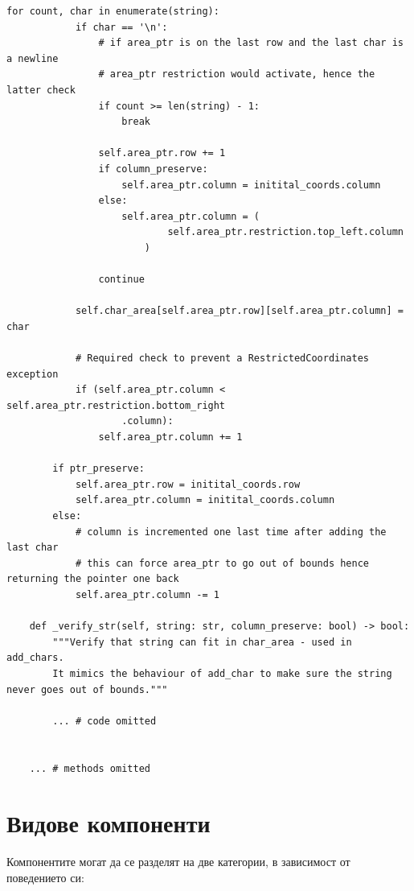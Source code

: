 \begin{lstlisting}[style=py]
        for count, char in enumerate(string):
            if char == '\n':
                # if area_ptr is on the last row and the last char is a newline
                # area_ptr restriction would activate, hence the latter check
                if count >= len(string) - 1:
                    break

                self.area_ptr.row += 1
                if column_preserve:
                    self.area_ptr.column = initital_coords.column
                else:
                    self.area_ptr.column = (
                            self.area_ptr.restriction.top_left.column
                        )

                continue

            self.char_area[self.area_ptr.row][self.area_ptr.column] = char

            # Required check to prevent a RestrictedCoordinates exception
            if (self.area_ptr.column < self.area_ptr.restriction.bottom_right
                    .column):
                self.area_ptr.column += 1

        if ptr_preserve:
            self.area_ptr.row = initital_coords.row
            self.area_ptr.column = initital_coords.column
        else:
            # column is incremented one last time after adding the last char
            # this can force area_ptr to go out of bounds hence returning the pointer one back
            self.area_ptr.column -= 1

    def _verify_str(self, string: str, column_preserve: bool) -> bool:
        """Verify that string can fit in char_area - used in add_chars.
        It mimics the behaviour of add_char to make sure the string never goes out of bounds."""

        ... # code omitted


    ... # methods omitted
        \end{lstlisting}


\section{Видове компоненти}
        Компонентите могат да се разделят на две категории, в зависимост от
        поведението си:


